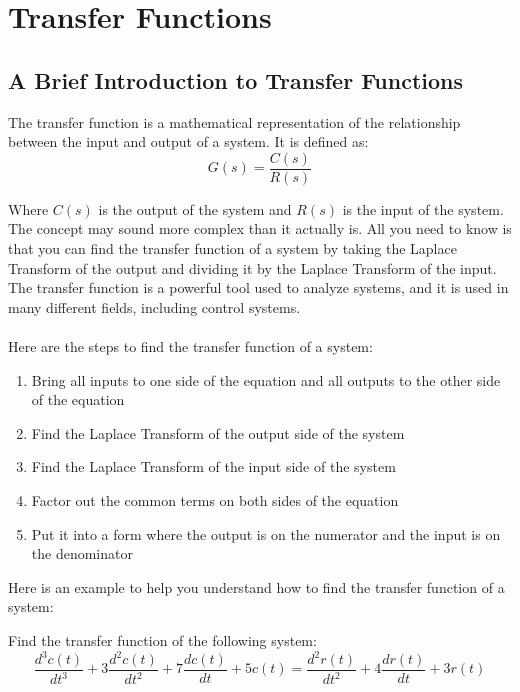 \documentclass{article}
\theoremstyle{mytheoremstyle}
\theoremstyle{mytheoremstyle}
\theoremstyle{myproblemstyle}
\theoremstyle{break}
\begin{document}
\section{Transfer Functions}
\label{sec:Transfer_Function}
\subsection{A Brief Introduction to Transfer Functions}
The transfer function is a mathematical representation of the relationship between the input and output of a system. It is defined as:
\begin{equation}
	G(s) = \frac{C(s)}{R(s)}
\end{equation}

Where $C(s)$ is the output of the system and $R(s)$ is the input of the system. The concept may sound more complex than it actually is. All you need to know is that you can find the transfer function of a system by taking the Laplace Transform of the output and dividing it by the Laplace Transform of the input. The transfer function is a powerful tool used to analyze systems, and it is used in many different fields, including control systems.\\\\
Here are the steps to find the transfer function of a system:
\begin{enumerate}
	\item Bring all inputs to one side of the equation and all outputs to the other side of the equation
	\item Find the Laplace Transform of the output side of the system
	\item Find the Laplace Transform of the input side of the system
	\item Factor out the common terms on both sides of the equation
	\item Put it into a form where the output is on the numerator and the input is on the denominator
\end{enumerate}
Here is an example to help you understand how to find the transfer function of a system:

\begin{problem}
Find the transfer function of the following system:
\begin{equation}
	\frac{d^3c(t)}{dt^3} + 3\frac{d^2c(t)}{dt^2} + 7\frac{dc(t)}{dt} + 5c(t) = \frac{d^2r(t)}{dt^2} + 4\frac{dr(t)}{dt} + 3r(t)
\end{equation}
\end{problem}
\end{document}
